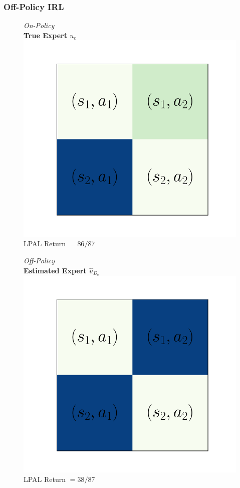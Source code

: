 \documentclass{beamer}
\begin{document}
\begin{frame}
\frametitle{Off-Policy IRL}
\begin{figure}
  \begin{center}
  \begin{minipage}{0.45\linewidth}
    \centering
    \emph{On-Policy}\\
    \textbf{True Expert $u_e$}
    \includegraphics[width=\linewidth]{./plots/all_state/ue.pdf}
    LPAL Return $= 86/87$
  \end{minipage}
  \begin{minipage}{0.45\linewidth}
    \centering
    \emph{Off-Policy}\\
    \textbf{Estimated Expert $\hat{u}_{D_e}$}
    \includegraphics[width=\linewidth]{./plots/all_state/uehat.pdf}
    LPAL Return $= 38/87$
  \end{minipage}
  \end{center}
\end{figure}
\end{frame}
\end{document}
